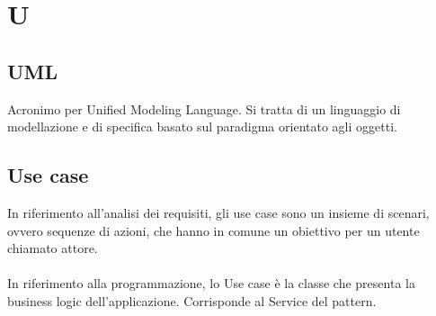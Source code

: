 \chapter{U}
\section{UML}\label{sec:Unified Modeling Language}
Acronimo per Unified Modeling Language. Si tratta di un linguaggio di modellazione e di specifica basato sul paradigma orientato agli oggetti.

\section{Use case}\label{sec:Use Cases}
In riferimento all'analisi dei requisiti, gli use case sono un insieme di scenari, ovvero sequenze di azioni, che hanno in comune un obiettivo per un utente chiamato attore.\\ \\
In riferimento alla programmazione, lo Use case è la classe che presenta la business logic dell'applicazione. Corrisponde al Service del  pattern.
